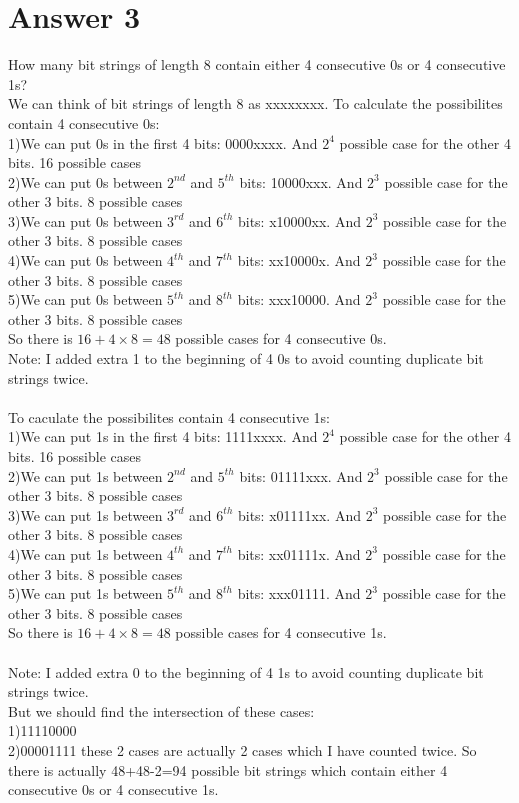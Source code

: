 \documentclass[12pt]{article}
\begin{document}
\section*{Answer 3}
How many bit strings of length 8 contain either 4 consecutive 0s or 4 consecutive 1s?\\
We can think of bit strings of length 8 as xxxxxxxx. To calculate the possibilites contain 4 consecutive 0s:\\
1)We can put 0s in the first 4 bits: 0000xxxx. And $2^4$ possible case for the other 4 bits. 16 possible cases\\
2)We can put 0s between $2^{nd}$ and $5^{th}$ bits: 10000xxx.  And $2^3$ possible case for the other 3 bits. 8 possible cases\\
3)We can put 0s between $3^{rd}$ and $6^{th}$ bits: x10000xx. And $2^3$ possible case for the other 3 bits. 8 possible cases\\
4)We can put 0s between $4^{th}$ and $7^{th}$ bits: xx10000x. And $2^3$ possible case for the other 3 bits. 8 possible cases\\
5)We can put 0s between $5^{th}$ and $8^{th}$ bits: xxx10000. And $2^3$ possible case for the other 3 bits. 8 possible cases\\
So there is $16+4\times8=48$ possible cases for 4 consecutive 0s.\\
Note: I added extra 1 to the beginning of 4 0s to avoid counting duplicate bit strings twice.\\\\
To caculate the possibilites contain 4 consecutive 1s:\\
1)We can put 1s in the first 4 bits: 1111xxxx. And $2^4$ possible case for the other 4 bits. 16 possible cases\\
2)We can put 1s between $2^{nd}$ and $5^{th}$ bits: 01111xxx.  And $2^3$ possible case for the other 3 bits. 8 possible cases\\
3)We can put 1s between $3^{rd}$ and $6^{th}$ bits: x01111xx. And $2^3$ possible case for the other 3 bits. 8 possible cases\\
4)We can put 1s between $4^{th}$ and $7^{th}$ bits: xx01111x. And $2^3$ possible case for the other 3 bits. 8 possible cases\\
5)We can put 1s between $5^{th}$ and $8^{th}$ bits: xxx01111. And $2^3$ possible case for the other 3 bits. 8 possible cases\\
So there is $16+4\times8=48$ possible cases for 4 consecutive 1s.\\\\
Note: I added extra 0 to the beginning of 4 1s to avoid counting duplicate bit strings twice.\\
But we should find the intersection of these cases:\\
1)11110000\\
2)00001111 these 2 cases are actually 2 cases which I have counted twice. So there is actually 48+48-2=94 possible bit strings which contain either 4 consecutive 0s or 4 consecutive 1s.
\end{document}
